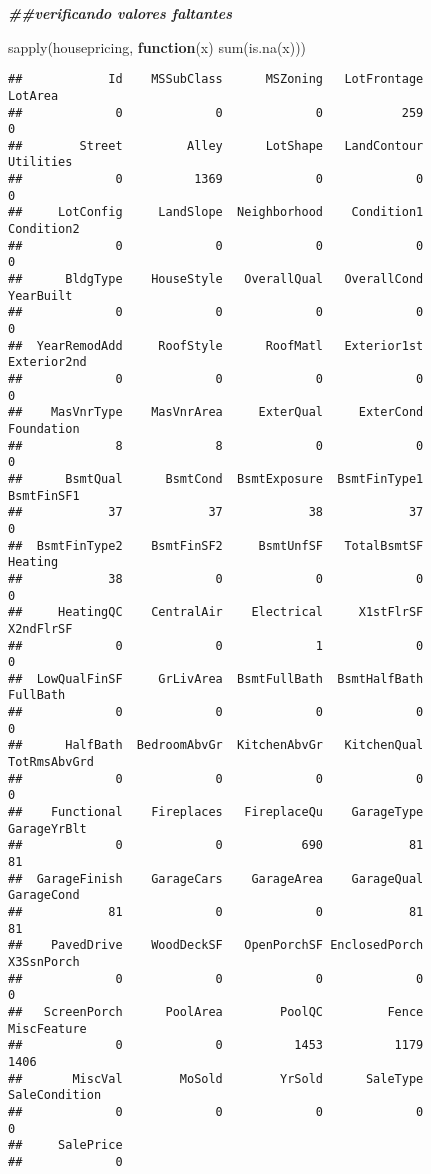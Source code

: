 \documentclass[
]{article}
\newenvironment{Shaded}{\begin{snugshade}}{\end{snugshade}}
\newcommand{\ControlFlowTok}[1]{\textcolor[rgb]{0.13,0.29,0.53}{\textbf{#1}}}
\newcommand{\DocumentationTok}[1]{\textcolor[rgb]{0.56,0.35,0.01}{\textbf{\textit{#1}}}}
\newcommand{\FunctionTok}[1]{\textcolor[rgb]{0.00,0.00,0.00}{#1}}
\newcommand{\NormalTok}[1]{#1}
\begin{document}
\begin{Shaded}
\begin{Highlighting}[]
\DocumentationTok{\#\#verificando valores faltantes}

\FunctionTok{sapply}\NormalTok{(housepricing, }\ControlFlowTok{function}\NormalTok{(x) }\FunctionTok{sum}\NormalTok{(}\FunctionTok{is.na}\NormalTok{(x)))}
\end{Highlighting}
\end{Shaded}

\begin{verbatim}
##            Id    MSSubClass      MSZoning   LotFrontage       LotArea 
##             0             0             0           259             0 
##        Street         Alley      LotShape   LandContour     Utilities 
##             0          1369             0             0             0 
##     LotConfig     LandSlope  Neighborhood    Condition1    Condition2 
##             0             0             0             0             0 
##      BldgType    HouseStyle   OverallQual   OverallCond     YearBuilt 
##             0             0             0             0             0 
##  YearRemodAdd     RoofStyle      RoofMatl   Exterior1st   Exterior2nd 
##             0             0             0             0             0 
##    MasVnrType    MasVnrArea     ExterQual     ExterCond    Foundation 
##             8             8             0             0             0 
##      BsmtQual      BsmtCond  BsmtExposure  BsmtFinType1    BsmtFinSF1 
##            37            37            38            37             0 
##  BsmtFinType2    BsmtFinSF2     BsmtUnfSF   TotalBsmtSF       Heating 
##            38             0             0             0             0 
##     HeatingQC    CentralAir    Electrical     X1stFlrSF     X2ndFlrSF 
##             0             0             1             0             0 
##  LowQualFinSF     GrLivArea  BsmtFullBath  BsmtHalfBath      FullBath 
##             0             0             0             0             0 
##      HalfBath  BedroomAbvGr  KitchenAbvGr   KitchenQual  TotRmsAbvGrd 
##             0             0             0             0             0 
##    Functional    Fireplaces   FireplaceQu    GarageType   GarageYrBlt 
##             0             0           690            81            81 
##  GarageFinish    GarageCars    GarageArea    GarageQual    GarageCond 
##            81             0             0            81            81 
##    PavedDrive    WoodDeckSF   OpenPorchSF EnclosedPorch    X3SsnPorch 
##             0             0             0             0             0 
##   ScreenPorch      PoolArea        PoolQC         Fence   MiscFeature 
##             0             0          1453          1179          1406 
##       MiscVal        MoSold        YrSold      SaleType SaleCondition 
##             0             0             0             0             0 
##     SalePrice 
##             0
\end{verbatim}
\end{document}
